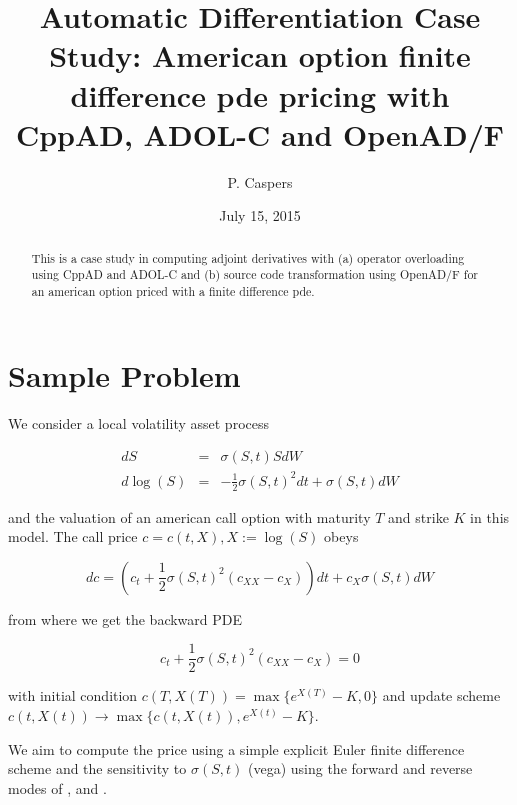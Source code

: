 \documentclass{amsart}
\theoremstyle{plain}
\numberwithin{equation}{section}
\begin{document}
\title[AD]{Automatic Differentiation Case Study: American option finite difference pde pricing with CppAD, ADOL-C and OpenAD/F}
\author{P. Caspers}
\date{July 15, 2015}
\begin{abstract}
This is a case study in computing adjoint derivatives with (a) operator overloading using CppAD \cite{CppAD} and ADOL-C \cite{ADOLC} and (b) source code transformation using OpenAD/F \cite{OpenAD} for an american option priced with a finite difference pde.
\end{abstract}

\maketitle

\tableofcontents

\section{Sample Problem}

We consider a local volatility asset process 

\begin{eqnarray}
dS &=& \sigma(S,t) S dW \\
d\log(S) &=& -\frac{1}{2}\sigma(S,t)^2 dt + \sigma(S,t) dW
\end{eqnarray}

and the valuation of an american call option with maturity $T$ and strike $K$ in this model. The call price $c = c(t,X), X:=\log(S)$ obeys

\begin{equation}
dc = \left(c_t + \frac{1}{2} \sigma(S,t)^2 (c_{XX}-c_{X}) \right) dt + c_X \sigma(S,t) dW 
\end{equation}

from where we get the backward PDE

\begin{equation}
c_t + \frac{1}{2}\sigma(S,t)^2(c_{XX}-c_X) = 0
\end{equation}

with initial condition $c(T,X(T)) = \max\{ e^{X(T)}  - K, 0 \}$ and update scheme $c(t,X(t)) \rightarrow \max \{ c(t,X(t)), e^{X(t)} - K \}$.

We aim to compute the price using a simple explicit Euler finite difference scheme and the sensitivity to $\sigma(S,t)$ (vega) using the forward and reverse modes of \cite{CppAD}, \cite{ADOLC} and \cite{OpenAD}. 
\end{document}
